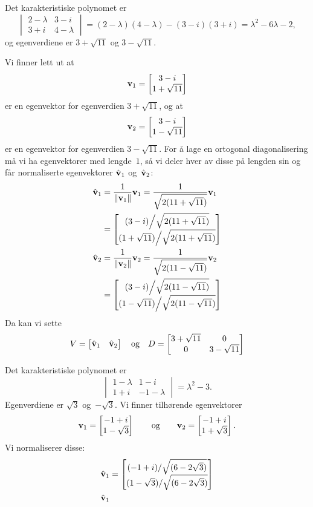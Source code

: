 \begin{losning}
\begin{punkt}
Det karakteristiske polynomet er
\[
\begin{vmatrix}
2 - \lambda & 3 - i       \\
3 + i       & 4 - \lambda
\end{vmatrix}
= (2 - \lambda)(4 - \lambda) - (3 - i)(3 + i)
= \lambda^2 - 6\lambda - 2,
\]
og egenverdiene er $3 + \sqrt{11}$ og $3 - \sqrt{11}$.

Vi finner lett ut at
\[
\mathbf{v}_1 = \begin{bmatrix} 3-i \\ 1+\sqrt{11} \end{bmatrix}
\]
er en egenvektor for egenverdien $3 + \sqrt{11}$, og at
\[
\mathbf{v}_2 = \begin{bmatrix} 3-i \\ 1-\sqrt{11} \end{bmatrix}
\]
er en egenvektor for egenverdien $3 - \sqrt{11}$.  For å lage en
ortogonal diagonalisering må vi ha egenvektorer med lengde~$1$, så vi
deler hver av disse på lengden sin og får normaliserte egenvektorer
$\hat{\mathbf{v}}_1$ og~$\hat{\mathbf{v}}_2$:
\begin{align*}
\hat{\mathbf{v}}_1
&= \frac{1}{\| \mathbf{v}_1 \|} \mathbf{v}_1
 = \frac{1}{\sqrt{2 (11+\sqrt{11})}} \mathbf{v}_1 \\
&= \begin{bmatrix} (3-i) \Big/ \sqrt{2 (11+\sqrt{11})} \\ (1+\sqrt{11}) \Big/ \sqrt{2 (11+\sqrt{11})} \end{bmatrix}
\\
\hat{\mathbf{v}}_2
&= \frac{1}{\| \mathbf{v}_2 \|} \mathbf{v}_2
 = \frac{1}{\sqrt{2 (11-\sqrt{11})}} \mathbf{v}_2 \\
&= \begin{bmatrix} (3-i) \Big/ \sqrt{2 (11-\sqrt{11})} \\ (1-\sqrt{11}) \Big/ \sqrt{2 (11-\sqrt{11})} \end{bmatrix}
\end{align*}
Da kan vi sette
\[
V = \begin{bmatrix} \hat{\mathbf{v}}_1 & \hat{\mathbf{v}}_2 \end{bmatrix}
\quad\text{og}\quad
D =
\begin{bmatrix}
3+\sqrt{11} & 0           \\
0           & 3-\sqrt{11}
\end{bmatrix}
\]
\end{punkt}
\begin{punkt}
Det karakteristiske polynomet er
\[
\begin{vmatrix}
1-\lambda & 1-i\\
1+i & -1-\lambda
\end{vmatrix}
= \lambda^2 - 3.
\]
Egenverdiene er $\sqrt{3}$ og~$-\sqrt{3}$.  Vi finner tilhørende
egenvektorer
\[
\mathbf{v}_1 = \begin{bmatrix} -1+i \\ 1-\sqrt{3} \end{bmatrix}
\qquad\text{og}\qquad
\mathbf{v}_2 = \begin{bmatrix} -1+i \\ 1+\sqrt{3} \end{bmatrix}.
\]
Vi normaliserer disse:
\begin{align*}
\hat\v_1
&= \vv{(-1+i)/\sqrt{(6-2\sqrt{3})}}
      {(1-\sqrt{3})/\sqrt{(6-2\sqrt{3})}}
\\
\hat\v_1

\end{align*}
\end{punkt}
\end{losning}
